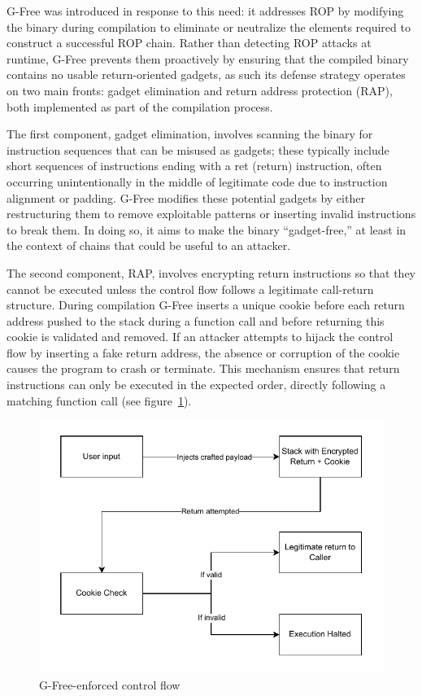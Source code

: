 \documentclass[a4paper]{usiinfbachelorproject}
\begin{document}
G-Free was introduced in response to this need: it addresses ROP by modifying the binary during compilation to eliminate or neutralize the elements required to construct a successful ROP chain. Rather than detecting ROP attacks at runtime, G-Free prevents them proactively by ensuring that the compiled binary contains no usable return-oriented gadgets, as such its defense strategy operates on two main fronts: gadget elimination and return address protection (RAP), both implemented as part of the compilation process.

The first component, gadget elimination, involves scanning the binary for instruction sequences that can be misused as gadgets; these typically include short sequences of instructions ending with a ret (return) instruction, often occurring unintentionally in the middle of legitimate code due to instruction alignment or padding. G-Free modifies these potential gadgets by either restructuring them to remove exploitable patterns or inserting invalid instructions to break them. In doing so, it aims to make the binary “gadget-free,” at least in the context of chains that could be useful to an attacker.

The second component, RAP, involves encrypting return instructions so that they cannot be executed unless the control flow follows a legitimate call-return structure. During compilation G-Free inserts a unique cookie before each return address pushed to the stack during a function call and before returning this cookie is validated and removed. If an attacker attempts to hijack the control flow by inserting a fake return address, the absence or corruption of the cookie causes the program to crash or terminate. This mechanism ensures that return instructions can only be executed in the expected order, directly following a matching function call (see figure~\ref{fig:rop_protected}).

\begin{figure}[h!]
	\centering
	\includegraphics[scale=1]{figures/ROP-Protected.pdf}
	\caption{G-Free-enforced control flow}
	\label{fig:rop_protected}
\end{figure}
\end{document}
